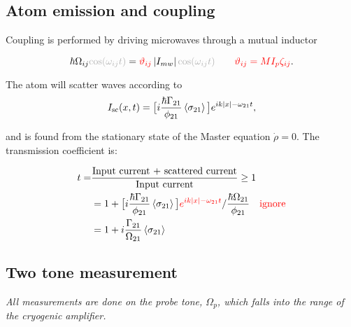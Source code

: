  
%		
%		
	
	\subsection{Atom emission and coupling}
	 Coupling is performed by driving microwaves through a mutual inductor
	 
	 \begin{equation}\label{key}
	 	\hbar\Omega_{ij}\grey{\cos(\omega_{ij} t)} = \red{\vartheta_{ij}}\iabs{I_{mw}}\grey{\cos(\omega_{ij} t)}\qquad \red{\vartheta_{ij} = MI_p\zeta_{ij}}.
	 \end{equation}
	 
	 \noindent The atom will scatter waves according to
	 \[
	 	I_\text{sc}(x,t) = \big[i\frac{\hbar\Gamma_{21}}{\phi_{21}}\left\langle \sigma_{21} \right\rangle\big]e^{ik\left|x\right|-\omega_{21}t},
	 \]
	 
	 \noindent and  is found from the stationary state of the Master equation $ \dot{\rho} = 0 $. The transmission coefficient is:
	 
	 \[
	 	\begin{aligned}
		 	t = & \frac{\text{Input current + scattered current}}{\text{Input current}} \ge 1\\
		 	& = 1 + \big[i\frac{\hbar\Gamma_{21}}{\phi_{21}}\left\langle \sigma_{21} \right\rangle\big]{\color{red}{e^{ik\ensuremath{\left|x\right|}-\omega_{21}t}}}/\frac{\hbar\Omega_{21}}{\phi_{21}}\quad {\color{red}{\text{ignore}}}\\
		 	& = 1 + i\frac{\Gamma_{21}}{\Omega_{21}}\left\langle \sigma_{21} \right\rangle
	 	\end{aligned}
	 \]
	 
 
 \subsection{Two tone measurement}
  \textit{All measurements are done on the probe tone, $ \Omega_p $, which falls into the range of the cryogenic amplifier.}
  
